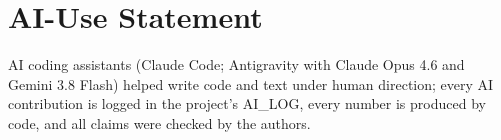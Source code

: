 \documentclass[conference]{IEEEtran}
\begin{document}
\section*{AI-Use Statement}
AI coding assistants (Claude Code; Antigravity with Claude Opus 4.6 and Gemini 3.8 Flash) helped
write code and text under human direction; every AI contribution is logged in the project's
AI\_LOG, every number is produced by code, and all claims were checked by the authors.



\end{document}
